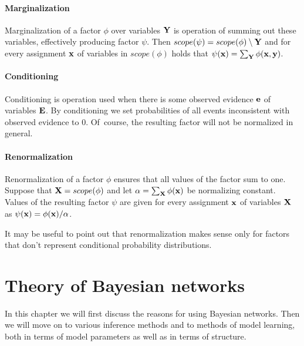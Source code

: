 \documentclass[english,cover]{fitthesis} %
\newcommand{\vars}[1]{{\bold{#1}}}         %
\begin{document}
\subsubsection{Marginalization}
Marginalization of a factor $\phi$ over variables $\vars{Y}$ is operation of summing out these variables, effectively producing factor $\psi$. Then $scope(\psi) = scope(\phi) \setminus \vars{Y}$ and for every assignment $\vars{x}$ of variables in $scope(\phi)$ holds that $\psi(\vars{x}) = \sum_\vars{Y} \phi(\vars{x},\vars{y})$.

\subsubsection{Conditioning}
Conditioning is operation used when there is some observed evidence $\vars{e}$ of variables $\vars{E}$. By conditioning we set probabilities of all events inconsistent with observed evidence to 0. Of~course, the resulting factor will not be normalized in general.

\subsubsection{Renormalization}
Renormalization of a factor $\phi$ ensures that all values of the factor sum to one. Suppose that $\vars{X} = scope(\phi)$ and let $\alpha = \sum_\vars{X} \phi(\vars{x})$ be normalizing constant. Values of the resulting factor $\psi$ are given for every assignment $\vars{x}$ of variables $\vars{X}$ as $\psi(\vars{x}) = \phi(\vars{x}) / \alpha$.

It may be useful to point out that renormalization makes sense only for factors that don't represent conditional probability distributions.



































\chapter{Theory of Bayesian networks}
In this chapter we will first discuss the reasons for using Bayesian networks. Then we will move on to various inference methods and to methods of model learning, both in terms of model parameters as well as in terms of structure.
\end{document}
